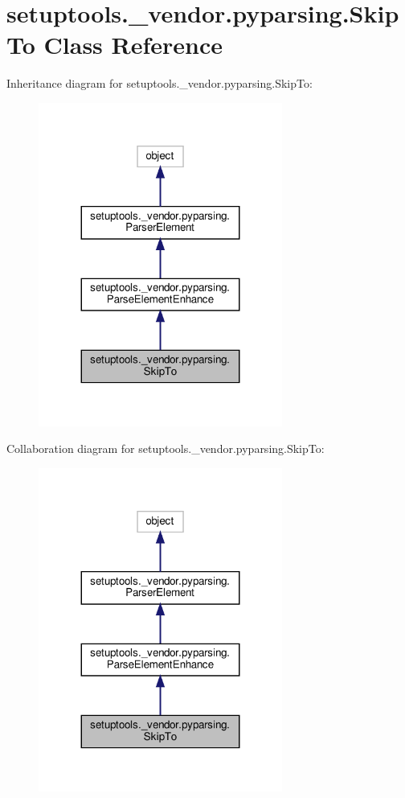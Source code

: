 \hypertarget{classsetuptools_1_1__vendor_1_1pyparsing_1_1SkipTo}{}\section{setuptools.\+\_\+vendor.\+pyparsing.\+Skip\+To Class Reference}
\label{classsetuptools_1_1__vendor_1_1pyparsing_1_1SkipTo}


Inheritance diagram for setuptools.\+\_\+vendor.\+pyparsing.\+Skip\+To\+:
\nopagebreak
\begin{figure}[H]
\begin{center}
\leavevmode
\includegraphics[width=227pt]{classsetuptools_1_1__vendor_1_1pyparsing_1_1SkipTo__inherit__graph}
\end{center}
\end{figure}


Collaboration diagram for setuptools.\+\_\+vendor.\+pyparsing.\+Skip\+To\+:
\nopagebreak
\begin{figure}[H]
\begin{center}
\leavevmode
\includegraphics[width=227pt]{classsetuptools_1_1__vendor_1_1pyparsing_1_1SkipTo__coll__graph}
\end{center}
\end{figure}
